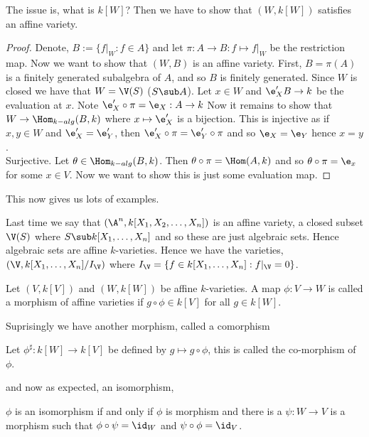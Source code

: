 

\noindent
The issue is, what is $k[W]$? Then we have to show that $(W, k[W])$ satisfies an affine variety.
\begin{proof}
  Denote, $B := \{f|_W : f \in A\}$ and let $\pi : A \to B : f \mapsto f|_W$ be the restriction map. Now we want to show that $(W, B)$ is an affine variety. First, $B = \pi(A)$ is a finitely generated subalgebra of $A$, and so $B$ is finitely generated. Since $W$ is closed we have that $W = \V(S)$ ($S \sub A$). Let $x \in W$ and $\e'_X B \to k$ be the evaluation at $x$. Note $\e'_X \circ \pi = \e_X : A \to k$
  Now it remains to show that $W \to \Hom_{k-alg}(B, k)$ where $x \mapsto \e'_X$ is a bijection. This is injective as if $x, y \in W$ and $\e'_X =\e'_Y$, then $\e'_X \circ \pi = \e'_Y \circ \pi$ and so $\e_X = \e_Y$ hence $x = y$.\\

  \noindent
  Surjective. Let $\theta \in \Hom_{k-alg}(B, k)$. Then $\theta \circ \pi = \Hom(A, k)$ and so $\theta\circ \pi = \e_x$ for some $x \in V$. Now we want to show this is just some evaluation map.
\end{proof}

\begin{remark}
   This now gives us lots of examples.
\end{remark}
\begin{eg}
  Last time we say that $(\A^n, k[X_1, X_2, \dots, X_n])$ is an affine variety, a closed subset $\V(S)$ where $S \sub k[X_1, \dots, X_n]$ and so these are just algebraic sets. Hence algebraic sets are affine $k$-varieties. Hence we have the varieties, $(\V, k[X_1, \dots, X_n] / I_\V)$ where $I_\V = \{f \in k[X_1, \dots, X_n] : f|_\V = 0\}$.
\end{eg}

\begin{ndefi}[Morphism]
  Let $(V, k[V])$ and $(W, k[W])$ be affine $k$-varieties. A map $\phi : V \to W$ is called a morphism of affine varieties if $g \circ \phi \in k[V]$ for all $g \in k[W]$.
\end{ndefi}

\noindent
Suprisingly we have another morphism, called a comorphism
\begin{ndefi}[Co-morphism]
  Let $\phi^{\sharp} : k[W] \to k[V]$ be defined by $g \mapsto g \circ \phi$, this is called the co-morphism of $\phi$.
\end{ndefi}

\noindent
and now as expected, an isomorphism,
\begin{ndefi}[Isomorphism]
  $\phi$ is an isomorphism if and only if $\phi$ is morphism and there is a $\psi : W \to V$ is a morphism such that $\phi \circ \psi = \id_W$ and $\psi \circ \phi = \id_V$.
\end{ndefi}

